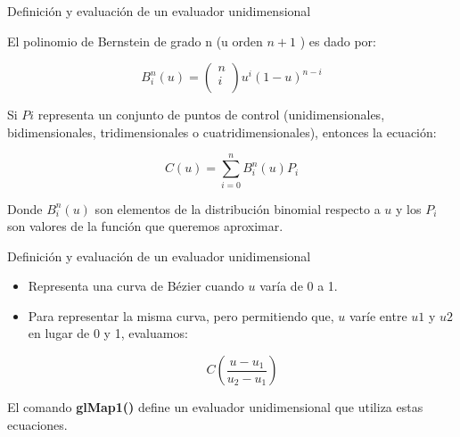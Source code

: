 \documentclass[10.5pt]{beamer}
\begin{document}
\begin{frame}{Definición y evaluación de un evaluador unidimensional}
\justifying

El polinomio de Bernstein de grado n (u orden $n+1$ ) es dado por:
\begin{block}
\small
    \begin{equation*}
    B_i^n\left(u\right)=\left(\begin{matrix}n\\i\\\end{matrix}\right)u^i\left(1-u\right)^{n-i}
    \end{equation*}
\end{block}
Si $Pi$ representa un conjunto de puntos de control (unidimensionales, bidimensionales, tridimensionales o cuatridimensionales), entonces la ecuación:
\begin{block}
\small
    \begin{equation*}
   C\left(u\right)=\sum_{i=0}^{n}{B_i^n\left(u\right)}P_i
    \end{equation*}
\end{block}
Donde $B_{i}^{n}(u)$ son elementos de la distribución binomial respecto a $u$ y los $P_{i}$ son valores de la función que queremos aproximar.
\end{frame}
\begin{frame}{Definición y evaluación de un evaluador unidimensional}
\begin{itemize}
    \item Representa una curva de Bézier cuando $u$ varía de 0 a 1.
    \item Para representar la misma curva, pero permitiendo que, $u$ varíe entre $u1$ y $u2$ en lugar de 0 y 1, evaluamos:
    \begin{block}
     \small
    \begin{equation*}
          C\left(\frac{u-u_1}{u_2-u_1}\right)
    \end{equation*}
\end{block}
\end{itemize}
El comando \textbf{glMap1()} define un evaluador unidimensional que utiliza estas ecuaciones.\newline


\end{frame}
\end{document}
